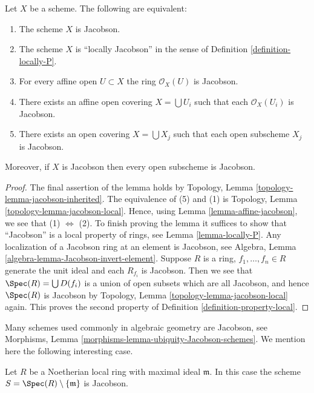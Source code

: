 \begin{lemma}
\label{lemma-locally-jacobson}
Let $X$ be a scheme. The following are equivalent:
\begin{enumerate}
\item The scheme $X$ is Jacobson.
\item The scheme $X$ is ``locally Jacobson'' in the sense of
Definition \ref{definition-locally-P}.
\item For every affine open $U \subset X$ the ring $\mathcal{O}_X(U)$
is Jacobson.
\item There exists an affine open covering $X = \bigcup U_i$ such that
each $\mathcal{O}_X(U_i)$ is Jacobson.
\item There exists an open covering $X = \bigcup X_j$
such that each open subscheme $X_j$ is Jacobson.
\end{enumerate}
Moreover, if $X$ is Jacobson then every open subscheme
is Jacobson.
\end{lemma}

\begin{proof}
The final assertion of the lemma holds by
Topology, Lemma \ref{topology-lemma-jacobson-inherited}.
The equivalence of (5) and (1) is
Topology, Lemma \ref{topology-lemma-jacobson-local}.
Hence, using Lemma \ref{lemma-affine-jacobson},
we see that (1) $\Leftrightarrow$ (2).
To finish proving the lemma it suffices to show that ``Jacobson''
is a local property of rings, see Lemma \ref{lemma-locally-P}.
Any localization of a Jacobson ring at an element is Jacobson, see
Algebra, Lemma \ref{algebra-lemma-Jacobson-invert-element}.
Suppose $R$ is a ring, $f_1, \ldots, f_n \in R$ generate the unit
ideal and each $R_{f_i}$ is Jacobson. Then we see that
$\Spec(R) = \bigcup D(f_i)$ is a union of open subsets
which are all Jacobson, and hence $\Spec(R)$ is Jacobson
by Topology, Lemma \ref{topology-lemma-jacobson-local} again.
This proves the second property of Definition \ref{definition-property-local}.
\end{proof}

\noindent
Many schemes used commonly in algebraic geometry are Jacobson, see
Morphisms, Lemma \ref{morphisms-lemma-ubiquity-Jacobson-schemes}.
We mention here the following interesting case.

\begin{lemma}
\label{lemma-complement-closed-point-Jacobson}
Let $R$ be a Noetherian local ring with maximal ideal $\mathfrak m$.
In this case the scheme $S = \Spec(R) \setminus \{\mathfrak m\}$
is Jacobson.
\end{lemma}

